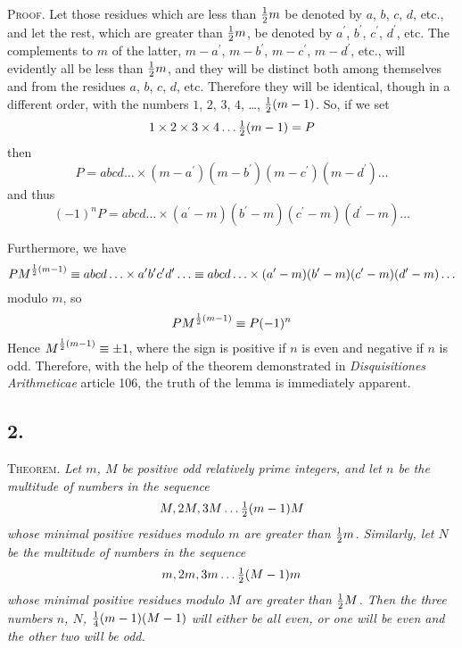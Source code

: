 \documentclass[twoside,12pt]{memoir}
\let\oldfrac\frac
\def\frac#1#2{\mathchoice{\tfrac{#1}{#2}}{\oldfrac{#1}{#2}}{\genfrac{}{}{}{2}{#1}{#2\mathstrut}}{\genfrac{}{}{}{3}{#1}{#2\mathstrut}}}
\begin{document}
\textsc{Proof.} Let those residues which are less than \(\frac{1}{2} m\) be denoted by \(a\), \(b\), \(c\), \(d\), etc{.}, and let the rest, which are greater than \(\frac{1}{2} m\), be denoted by \(a^{\prime}\), \(b^{\prime}\), \(c^{\prime}\), \(d^{\prime}\), etc{.} The complements to \(m\) of the latter,  \(m-a^{\prime}\), \(m-b^{\prime}\), \(m-c^{\prime}\), \(m-d^{\prime}\), etc{.}, will evidently all be less than \(\frac{1}{2} m\), and they will be distinct both among themselves and from the residues \(a\), \(b\), \(c\), \(d\), etc{.} Therefore they will be identical, though in a different order, with the numbers \(1\), \(2\), \(3\), \(4\), \ldots, \(\frac{1}{2}(m-1)\). So, if we set
\[1 \times 2 \times 3 \times 4 \ldots \frac{1}{2}(m-1)=P\]
then
\[P=a b c d \ldots \times(m-a^{\prime})(m-b^{\prime})(m-c^{\prime})(m-d^{\prime}) \ldots\]
and thus
\[(-1)^{n} P=a b c d \ldots \times(a^{\prime}-m)(b^{\prime}-m)(c^{\prime}-m)(d^{\prime}-m) \ldots\]
%

Furthermore, we have 
\[P M^{\frac{1}{2}(m-1)} \equiv a b c d \ldots \times a^{\prime} b^{\prime} c^{\prime} d^{\prime} \ldots \equiv a b c d \ldots \times(a^{\prime}-m)(b^{\prime}-m)(c^{\prime}-m)(d^{\prime}-m) \ldots\]
modulo \(m\), so
\[P M^{\frac{1}{2}(m-1)} \equiv P(-1)^{n}\]
Hence \(M^{\frac{1}{2}(m-1)} \equiv \pm 1\), where the sign is positive if \(n\) is even and negative if \(n\) is odd.  Therefore, with the help of the theorem demonstrated in \textit{Disquisitiones Arithmeticae} article 106, the truth of the lemma is immediately apparent. 
%

\subsection*{2.}
 
\textsc{Theorem.} \textit{Let \(m\), \(M\) be positive odd relatively prime integers, and let \(n\) be the multitude of numbers in the sequence}
\[M, 2 M, 3 M \ldots  \frac{1}{2}(m-1) M\]
\textit{whose minimal positive residues modulo \(m\) are greater than \(\frac{1}{2} m\).  Similarly, let \(N\) be the multitude of numbers in the sequence}
\[m, 2 m, 3 m \ldots \frac{1}{2}(M-1) m\]
\textit{whose minimal positive residues modulo \(M\) are greater than \(\frac{1}{2} M\). Then the three numbers \(n\), \(N\), \(\frac{1}{4}(m-1)(M-1)\) will either be all even, or one will be even and the other two will be odd.}
 
\end{document}
